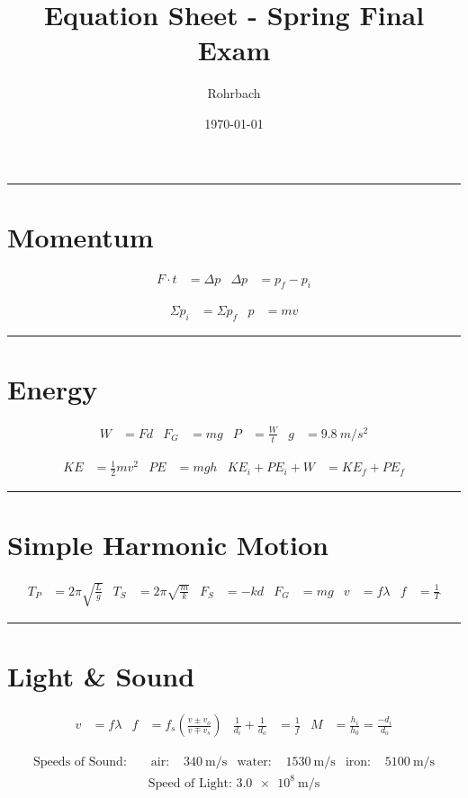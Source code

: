 \documentclass[11pt]{exam}
\title{Equation Sheet - Spring Final Exam}
\author{Rohrbach}
\date{\today}
\begin{document}
\maketitle

\vs
\hrule

\section*{Momentum}

  \begin{align*}
    F \cdot t &=  \Delta p &
    \Delta p  &= p_f - p_i
  \end{align*}

  \begin{align*}
      \Sigma p_i &= \Sigma p_f
    & p &=mv
  \end{align*}


\vs
\hrule
\section*{Energy}

    
  \begin{align*}
      W   &=  Fd
    & F_G &=  mg
    & P   &=  \frac{W}{t} 
    & g   &= \SI{9.8}{m/s^2}
  \end{align*}

  \begin{align*}
      KE    &= \frac{1}{2}mv^2 
    & PE    &= mgh
    & KE_i + PE_i + W &= KE_f + PE_f
  \end{align*}

\vs
\hrule
\section*{Simple Harmonic Motion}

    
  \begin{align*}
      T_P &=  2\pi \sqrt{\frac{L}{g}}
    & T_S &=  2\pi \sqrt{\frac{m}{k}}
    & F_S &=  -kd
    & F_G &=  mg
    & v   &=  f\lambda 
    & f   &= \frac{1}{T}
  \end{align*}

\vs
\hrule
\section*{Light \& Sound}

    
  \begin{align*}
      v   &=  f\lambda
    & f   &= f_s \left( \frac{v\pm v_o}{v\mp v_s} \right)
    & \frac{1}{d_i} + \frac{1}{d_o} &= \frac{1}{f}
    & M &= \frac{h_i}{h_0} = \frac{-d_i}{d_o}
  \end{align*}

  \begin{align*}
    \text{Speeds of Sound: } & 
    & \text{air: }   & \SI{340}{\meter\per\second}
    & \text{water: } & \SI{1530}{\meter\per\second}
    & \text{iron: }  & \SI{5100}{\meter\per\second}
  \end{align*}
  \begin{align*}
    \text{Speed of Light: }
    \SI{3.0e8}{\meter\per\second}
  \end{align*}
\end{document}
